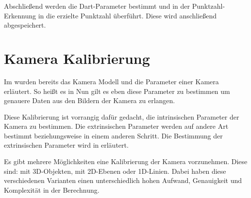 Abschließend werden die Dart-Parameter bestimmt und in der Punktzahl-Erkennung in die erzielte Punktzahl überführt. Diese wird anschließend abgespeichert.


\section{Kamera Kalibrierung}
\label{sec:camera}
Im  wurden bereits das Kamera Modell und die Parameter einer Kamera erläutert. So heißt es in \autocite[5]{Zhang2000}  Nun gilt es eben diese Parameter zu bestimmen um genauere Daten aus den Bildern der Kamera zu erlangen. 

Diese Kalibrierung ist vorrangig dafür gedacht, die intrinsischen Parameter der Kamera zu bestimmen. Die extrinsischen Parameter werden auf andere Art bestimmt beziehungsweise in einem anderen Schritt. Die Bestimmung der extrinsischen Parameter wird in  erläutert.

Es gibt mehrere Möglichkeiten eine Kalibrierung der Kamera vorzunehmen. Diese sind: mit 3D-Objekten, mit 2D-Ebenen oder 1D-Linien. Dabei haben diese verschiedenen Varianten einen unterschiedlich hohen Aufwand, Genauigkeit und Komplexität in der Berechnung. 

